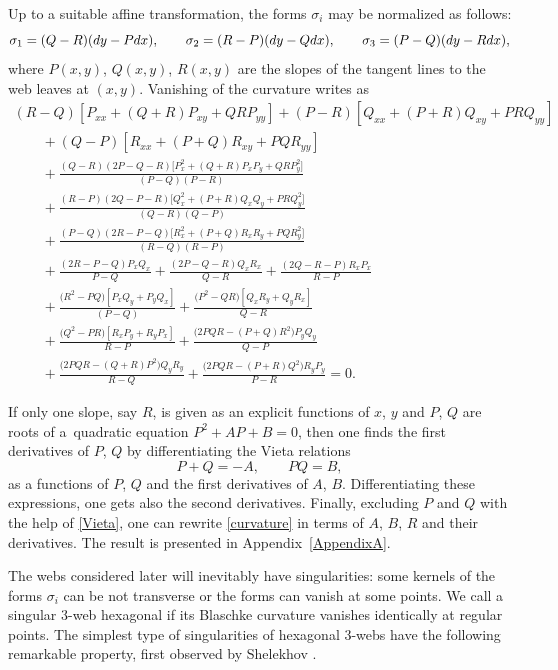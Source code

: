 \documentclass[11pt]{article}
\numberwithin{equation}{section}
\numberwithin{equation}{section}
\begin{document}
Up to a suitable affine transformation, the forms $\sigma_i$ may be normalized as follows:
\[
\sigma_1=(Q - R)({\rm d}y - P{\rm d}x), \qquad \sigma_2=(R - P)({\rm d}y - Q{\rm d}x), \qquad \sigma_3=(P - Q)({\rm d}y - R{\rm d}x),
\]
where $P(x,y)$, $Q(x,y)$, $R(x,y)$ are the slopes of the tangent lines to the web leaves at $(x,y)$. Vanishing of the curvature writes as
\begin{gather}
(R-Q )[P_{xx} +(Q + R)P_{xy} +QRP_{yy}]+(P-R)[Q_{xx} +(P + R)Q_{xy}+PRQ_{yy}]\nonumber\\
\qquad{}+ (Q - P)[R_{xx} +(P + Q)R_{xy}+PQR_{yy}]\nonumber\\
\qquad{}+ \frac{(Q - R)(2P - Q - R)\bigl[P^2_x+(Q+R)P_xP_y+QRP^2_y\bigr]}{(P-Q )(P - R)}\nonumber \\
\qquad{} +
 \frac{(R-P )(2Q -P- R)\bigl[Q^2_x+(P+R)Q_xQ_y+PRQ_y^2\bigr]}{(Q - R)(Q-P)}
\nonumber \\
\qquad{}+ \frac{(P - Q)(2R-P-Q)\bigl[R_x^2+(P+Q)R_xR_y+PQR_y^2\bigr]}{(R-Q)(R - P)} \nonumber\\
\qquad{}+
\frac{(2R-P-Q)P_xQ_x }{P-Q}+
 \frac{(2P-Q-R)Q_xR_x}{Q - R}+
 \frac{(2Q-R-P)R_xP_x}{R-P} \nonumber\\
\qquad{}+ \frac{ \bigl(R^2-PQ\bigr)[P_xQ_y+P_yQ_x]}{(P - Q)} +
 \frac{\bigl(P^2 - QR\bigr)[Q_xR_y+Q_yR_x]}{Q-R} \nonumber\\
\qquad{} +
 \frac{\bigl(Q^2-PR\bigr)[R_xP_y+R_yP_x]}{R-P} + \frac{\bigl(2PQR -(P+Q)R^2\bigr)P_yQ_y}{Q-P}\nonumber\\
 \qquad{} +
\frac{\bigl(2PQR-(Q+R)P^2\bigr)Q_yR_y}{R-Q} +
\frac{\bigl(2PQR-(P+R)Q^2\bigr)R_yP_y }{P-R} =0.\label{curvature}
\end{gather}

If only one slope, say $R$, is given as an explicit functions of $x$, $y$ and $P$, $Q$ are roots of a~quadratic equation $P^2+AP+B=0$, then one finds the first derivatives of $P$, $Q$ by differentiating the Vieta relations
\begin{equation}\label{Vieta}
P+Q=-A,\qquad PQ=B,
\end{equation}
as a functions of $P$, $Q$ and the first derivatives of $A$, $B$. Differentiating these expressions, one gets also the second derivatives. Finally, excluding $P$ and $Q$ with the help of \eqref{Vieta}, one can rewrite \eqref{curvature} in terms of $A$, $B$, $R$ and their derivatives. The result is presented in Appendix~\ref{AppendixA}.

The webs considered later will inevitably have singularities: some kernels of the forms $\sigma_i$ can be not transverse or the forms can vanish at some points. We call a singular 3-web hexagonal if its Blaschke curvature vanishes identically at regular points. The simplest type of singularities of hexagonal 3-webs have the following remarkable property, first observed by Shelekhov \cite{S-05}.
\end{document}

